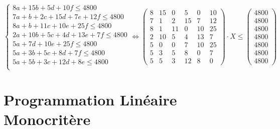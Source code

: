 \documentclass[a4paper, 11pt]{article}
\begin{document}
$$
\left\{\begin{split}
	8a+15b+5d+10f \leq 4800 \\
    7a+b+2c+15d+7e+12f \leq 4800 \\
    8a+b+11c+10e+25f \leq 4800 \\
    2a+10b+5c+4d+13e+7f \leq 4800 \\
    5a+7d+10e+25f \leq 4800 \\
	5a+3b+5c+8d+7f \leq 4800\\
	5a+5b+3c+12d+8e \leq 4800\\
\end{split}\right. \Leftrightarrow \begin{pmatrix}
        8&15&0&5&0&10 \\
        7&1&2&15&7&12\\
        8&1&11&0&10&25\\
        2&10&5&4&13&7\\
        5&0&0&7&10&25\\
        5&3&5&8&0&7\\
        5&5&3&12&8&0
    \end{pmatrix} \cdot X \leq \begin{pmatrix}
        4800\\
        4800\\
        4800\\
        4800\\
        4800\\
        4800\\
        4800
    \end{pmatrix}
$$ 

\section{Programmation Linéaire Monocritère}
\end{document}
